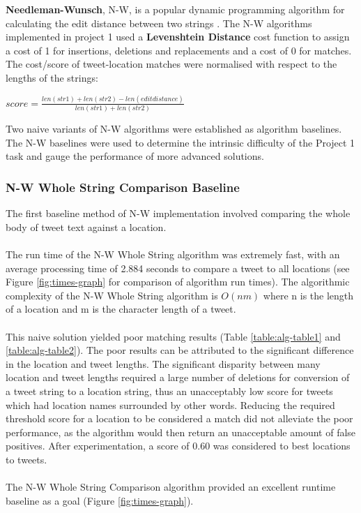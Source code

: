 \documentclass[11pt,a4paper]{article}
\begin{document}
\textbf{Needleman-Wunsch}, N-W, is a popular dynamic programming algorithm for calculating the edit distance between two strings \citep{nw}. The N-W algorithms implemented in project 1 used a \textbf{Levenshtein Distance} cost function to assign a cost of 1 for insertions, deletions and replacements and a cost of 0 for matches. The cost/score of tweet-location matches were normalised with respect to the lengths of the strings:
\begin{center}
$score = \frac{len(str1) + len(str2) - len(editdistance)}{len(str1) + len(str2)}$
\end{center}
Two naive variants of N-W algorithms were established as algorithm baselines. The N-W baselines were used to determine the intrinsic difficulty of the Project 1 task and gauge the performance of more advanced solutions.

\subsubsection{N-W Whole String Comparison Baseline}

The first baseline method of N-W implementation involved comparing the whole body of tweet text against a location.\\\\
The run time of the N-W Whole String algorithm was extremely fast, with an average processing time of 2.884 seconds to compare a tweet to all locations (see Figure \ref{fig:times-graph} for comparison of algorithm run times). The algorithmic complexity of the N-W Whole String algorithm is $O(nm)$ where n is the length of a location and m is the character length of a tweet\citep{nw}. \\\\ 
This naive solution yielded poor matching results (Table \ref{table:alg-table1} and \ref{table:alg-table2}). The poor results can be attributed to the significant difference in the location and tweet lengths. The significant disparity between many location and tweet lengths required a large number of deletions for conversion of a tweet string to a location string, thus an unacceptably low score for tweets which had location names surrounded by other words. Reducing the required threshold score for a location to be considered a match did not alleviate the poor performance, as the algorithm would then return an unacceptable amount of false positives. After experimentation, a score of 0.60 was considered to best locations to tweets.\\\\
The N-W Whole String Comparison algorithm provided an excellent runtime baseline as a goal (Figure \ref{fig:times-graph}).
\end{document}
